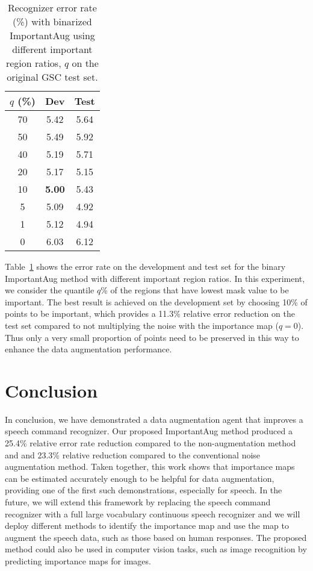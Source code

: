 \documentclass{article}
\begin{document}
\begin{table}
 \caption{Recognizer error rate (\%) with binarized ImportantAug using different important region ratios, $q$ on the original GSC test set.}
 \label{tab:importantAug_result3}
  \begin{center}
\begin{tabular}{ccc}
    \toprule
     $q$ (\%)  & Dev & Test  \\ 
     \midrule
70 &  5.42 & 5.64 \\  
     50 &  5.49 &  5.92 \\
     40 &  5.19 &  5.71 \\ 
     20 &  5.17  & 5.15   \\
     10 & \textbf{5.00} & 5.43 \\
      5 &  5.09 &  4.92 \\ 
      1 & 5.12 & 4.94\\
      0 & 6.03 &  6.12\\
     \bottomrule
  \end{tabular}
 \end{center}
\end{table}

Table~\ref{tab:importantAug_result3} shows the error rate on the development and test set for the binary ImportantAug method with different important region ratios. In this experiment, we consider the quantile $q$\% of the regions that have lowest mask value to be important. The best result is achieved on the development set by choosing 10\% of points to be important, which provides a 11.3\% relative error reduction on the test set compared to not multiplying the noise with the importance map ($q=0$). Thus only a very small proportion of points need to be preserved in this way to enhance the data augmentation performance.


\section{Conclusion}
In conclusion, we have demonstrated a data augmentation agent that improves a speech command recognizer. Our proposed ImportantAug method produced a 25.4\% relative error rate reduction compared to the non-augmentation method and and 23.3\% relative reduction compared to the conventional noise augmentation method. Taken together, this work shows that importance maps can be estimated accurately enough to be helpful for data augmentation, providing one of the first such demonstrations, especially for speech. In the future, we will extend this framework by replacing the speech command recognizer with a full large vocabulary continuous speech recognizer and we will deploy different methods to identify the importance map and use the map to augment the speech data, such as those based on human responses. The proposed method could also be used in computer vision tasks, such as image recognition by predicting importance maps for images. 
\end{document}
